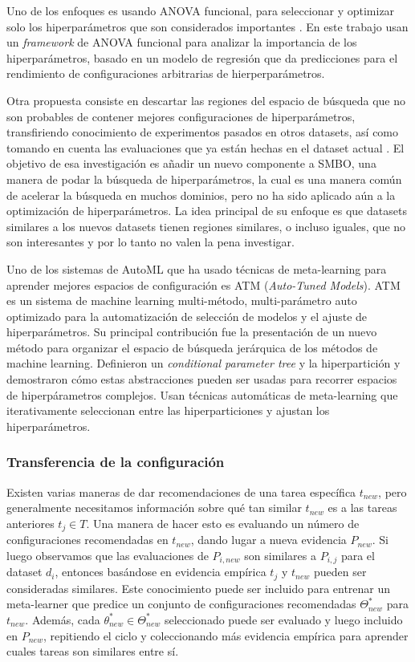 Uno de los enfoques es usando ANOVA funcional, para seleccionar y optimizar solo los hiperparámetros que son considerados importantes \cite{rijn2018hyp}. En este trabajo usan un \textit{framework} de ANOVA funcional para analizar la importancia de los hiperparámetros, basado en un modelo de regresión que da predicciones para el rendimiento de configuraciones arbitrarias de hierperparámetros.

Otra propuesta consiste en descartar las regiones del espacio de búsqueda que no son probables de contener mejores configuraciones de hiperparámetros, transfiriendo conocimiento de experimentos pasados en otros datasets, así como tomando en cuenta las evaluaciones que ya están hechas en el dataset actual \cite{witsuba2015hyper}. El objetivo de esa investigación es añadir un nuevo componente a SMBO, una manera de podar la búsqueda de hiperparámetros, la cual es una manera común de acelerar la búsqueda en muchos dominios, pero no ha sido aplicado aún a la optimización de hiperparámetros. La idea principal de su enfoque es que datasets similares a los nuevos datasets tienen regiones similares, o incluso iguales, que no son interesantes y por lo tanto no valen la pena investigar.

Uno de los sistemas de AutoML que ha usado técnicas de meta-learning para aprender mejores espacios de configuración es ATM (\textit{Auto-Tuned Models}). ATM es un sistema de machine learning multi-método, multi-parámetro auto optimizado para la automatización de selección de modelos y el ajuste de hiperparámetros. Su principal contribución fue la presentación de un nuevo método para organizar el espacio de búsqueda jerárquica de los métodos de machine learning. Definieron un \textit{conditional parameter tree} y la hiperpartición y demostraron cómo estas abstracciones pueden ser usadas para recorrer espacios de hiperpárametros complejos. Usan técnicas automáticas de meta-learning que iterativamente seleccionan entre las hiperparticiones y ajustan los hiperparámetros.

\subsubsection{Transferencia de la configuración}


Existen varias maneras de dar recomendaciones de una tarea específica $t_{new}$, pero generalmente necesitamos información sobre qué tan similar $t_{new}$ es a las tareas anteriores $t_j \in T$. Una manera de hacer esto es evaluando un número de configuraciones recomendadas en $t_{new}$, dando lugar a nueva evidencia $P_{new}$. Si luego observamos que las evaluaciones de $P_{i,new}$ son similares a $P_{i,j}$ para el dataset $d_i$, entonces basándose en evidencia empírica $t_j$ y $t_{new}$ pueden ser consideradas similares. Este conocimiento puede ser incluido para entrenar un meta-learner que predice un conjunto de configuraciones recomendadas $\Theta_{new}^*$ para $t_{new}$. Además, cada $\theta^*_{new} \in \Theta_{new}^*$ seleccionado puede ser evaluado y luego incluido en $P_{new}$, repitiendo el ciclo y coleccionando más evidencia empírica para aprender cuales tareas son similares entre sí.

